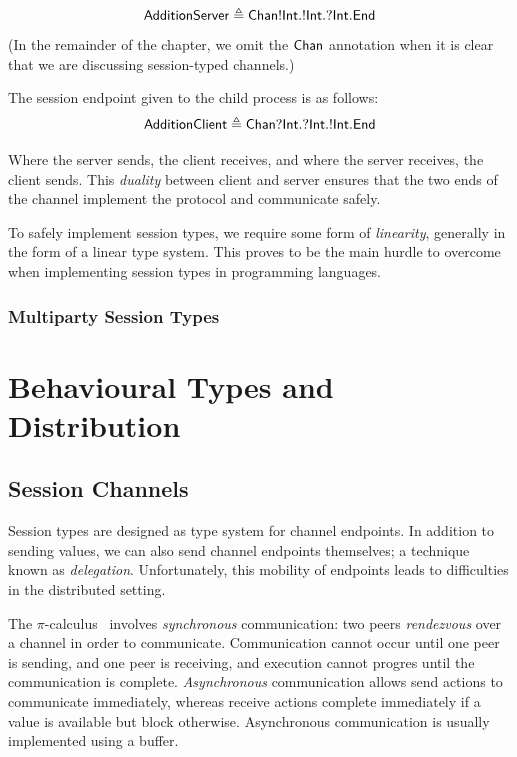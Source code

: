 \documentclass[
graybox,
envcountchap
]{svmult}
\begin{document}
\begin{bibunit}
  \[
    \mathsf{AdditionServer} \triangleq
    \mathsf{Chan}{{!}\mathsf{Int}.{!}\mathsf{Int}.{?}\mathsf{Int}}.\mathsf{End}
  \]
  (In the remainder of the chapter, we omit the $\mathsf{Chan}$ annotation when it
  is clear that we are discussing session-typed channels.)


  The session endpoint given to the child process is as follows:
  \[
    \mathsf{AdditionClient} \triangleq
    \mathsf{Chan}{{?}\mathsf{Int}.{?}\mathsf{Int}.{!}\mathsf{Int}}.\mathsf{End}
  \]

  Where the server sends, the client receives, and where the server receives,
  the client sends. This \emph{duality} between client and server ensures that
  the two ends of the channel implement the protocol and communicate safely.


  To safely implement session types, we require some form of \emph{linearity},
  generally in the form of a linear type system. This proves to be the main
  hurdle to overcome when implementing session types in programming languages.

  \subsubsection{Multiparty Session Types}\label{sec:bt:mpst}


  \section{Behavioural Types and Distribution}

  \subsection{Session Channels}
  Session types are designed as type system for channel endpoints.
  In addition to sending values, we can also send channel endpoints themselves;
  a technique known as \emph{delegation}. Unfortunately, this mobility of
  endpoints leads to difficulties in the distributed setting.

  The $\pi$-calculus~\cite{Milner99:pi-calc} involves \emph{synchronous}
  communication: two peers \emph{rendezvous} over a channel in order to
  communicate. Communication cannot occur until one peer is sending, and one
  peer is receiving, and execution cannot progres until the communication is
  complete. \emph{Asynchronous} communication allows send actions to communicate
  immediately, whereas receive actions complete immediately if a value is
  available but block otherwise.  Asynchronous communication is usually
  implemented using a buffer.


\end{bibunit}
\end{document}
